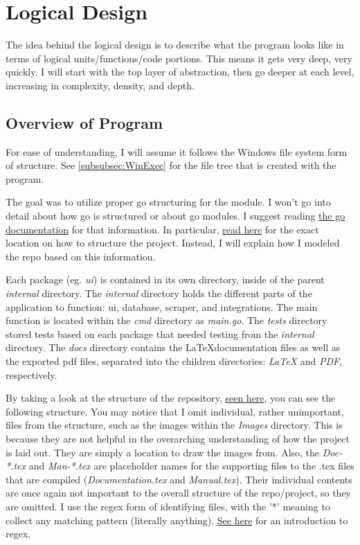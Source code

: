 \section{Logical Design}
\label{sec:LogicalDesign}

The idea behind the logical design is to describe what the program
looks like in terms of logical units/functions/code portions. This
means it gets very deep, very quickly. I will start with the top
layer of abstraction, then go deeper at each level, increasing in
complexity, density, and depth.

\subsection{Overview of Program}

For ease of understanding, I will assume it follows the Windows file
system form of structure.
See \ref{subsubsec:WinExec} for the file tree that is created with the program.

The goal was to utilize proper go structuring for the module. I won't
go into detail about how go is structured or about go modules. I
suggest reading \href{https://go.dev/doc/}{the go documentation} for
that information. In particular,
\href{https://go.dev/doc/modules/layout}{read here} for the exact location
on how to structure the project. Instead, I will explain how I
modeled the repo based
on this information.

Each package (eg. \textit{ui}) is contained
in its own directory, inside of the parent \textit{internal} directory.
The \textit{internal} directory holds the different parts of the
application to function: ui, database, scraper, and integrations.
The main function is located within the \textit{cmd} directory as
\textit{main.go}.
The \textit{tests} directory stored tests based on each package that
needed testing from the \textit{internal} directory.
The \textit{docs} directory contains the \LaTeX documentation files
as well as the exported pdf files, separated into the children
directories: \textit{LaTeX} and \textit{PDF}, respectively.

By taking a look at the structure of the repository,
\href{https://github.com/EZRA-DVLPR/GameList}{seen here},
you can see the following structure. You may notice that I omit
individual, rather unimportant, files from the structure, such as the
images within the \textit{Images} directory. This is because they are
not helpful in the overarching understanding of how the project is
laid out. They are simply a location to draw the images from.
Also, the \textit{Doc-*.tex} and \textit{Man-*.tex} are placeholder
names for the supporting files
to the .tex files that are compiled
(\textit{Documentation.tex} and \textit{Manual.tex}). Their
individual contents are once again not important to the overall
structure of the repo/project, so they are omitted.
I use the regex form of identifying files, with the '*'
meaning to collect any matching pattern (literally anything).
\href{https://regexr.com/}{See here} for an introduction to regex.

